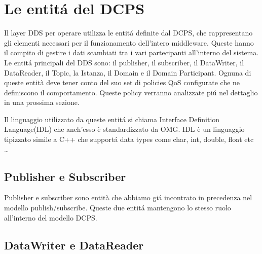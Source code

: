 

\section{Le entitá del DCPS}
Il layer DDS per operare utilizza le entitá definite dal DCPS, 
che rappresentano gli elementi necessari
per il funzionamento dell'intero middleware. Queste hanno il compito di 
gestire i dati
scambiati tra i vari partecipanti all'interno del sistema. 
Le entitá principali del DDS sono: 
il publisher, il subscriber, il DataWriter, il DataReader, il Topic,
la Istanza, il Domain e il Domain Participant.
Ognuna di queste entità deve tener conto del suo set di policies 
QoS configurate
che ne definiscono il comportamento. Queste policy verranno analizzate 
piú nel dettaglio in una prossima sezione.

Il linguaggio utilizzato da queste entitá si chiama Interface 
Definition Language(IDL) che anch'esso è standardizzato da OMG. 
IDL è un linguaggio tipizzato 
simile a C++ che supportá data types come char, int, double, float etc
\cite{1494965} \dots


\subsection{Publisher e Subscriber}
Publisher e subscriber sono entità che abbiamo giá incontrato
in precedenza nel modello publish/subscribe. Queste due entitá 
mantengono lo stesso ruolo all'interno del modello DCPS.

\subsection{DataWriter e DataReader}

